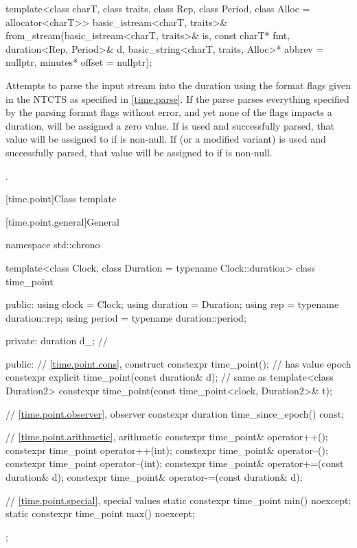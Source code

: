 %
\begin{itemdecl}
template<class charT, class traits, class Rep, class Period, class Alloc = allocator<charT>>
  basic_istream<charT, traits>&
    from_stream(basic_istream<charT, traits>& is, const charT* fmt,
                duration<Rep, Period>& d,
                basic_string<charT, traits, Alloc>* abbrev = nullptr,
                minutes* offset = nullptr);
\end{itemdecl}

\begin{itemdescr}
\pnum
\effects
Attempts to parse the input stream 
into the duration 
using the format flags given in the NTCTS 
as specified in \ref{time.parse}.
If the parse parses everything specified by the parsing format flags without error,
and yet none of the flags impacts a duration,
 will be assigned a zero value.
If  is used and successfully parsed,
that value will be assigned to  if  is non-null.
If  (or a modified variant) is used and successfully parsed,
that value will be assigned to  if  is non-null.

\pnum
\returns
{}.
\end{itemdescr}

[time.point]{Class template }

[time.point.general]{General}

%
\begin{codeblock}
namespace std::chrono {
  template<class Clock, class Duration = typename Clock::duration>
  class time_point {
  public:
    using clock    = Clock;
    using duration = Duration;
    using rep      = typename duration::rep;
    using period   = typename duration::period;

  private:
    duration d_;                                                // \expos

  public:
    // \ref{time.point.cons}, construct
    constexpr time_point();                                     // has value epoch
    constexpr explicit time_point(const duration& d);           // same as 
    template<class Duration2>
      constexpr time_point(const time_point<clock, Duration2>& t);

    // \ref{time.point.observer}, observer
    constexpr duration time_since_epoch() const;

    // \ref{time.point.arithmetic}, arithmetic
    constexpr time_point& operator++();
    constexpr time_point operator++(int);
    constexpr time_point& operator--();
    constexpr time_point operator--(int);
    constexpr time_point& operator+=(const duration& d);
    constexpr time_point& operator-=(const duration& d);

    // \ref{time.point.special}, special values
    static constexpr time_point min() noexcept;
    static constexpr time_point max() noexcept;
  };
}
\end{codeblock}

